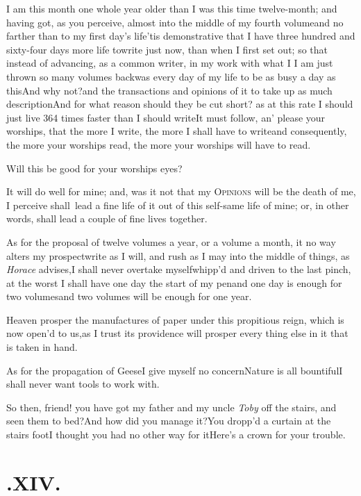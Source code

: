 \documentclass{article}
\begin{document}
I am this month one whole year older than I was this time twelve-month; and having
got, as you perceive, almost into the middle of my fourth volume\tsk and no farther
than to my first day’s life\tsk\break ’tis demonstrative that I have three hundred and
sixty-four days more life to\break write just now, than when I first set out;\break
so that instead of advancing, as a common writer, in my work with
what I
 I am just thrown so many volumes
back\break\tsk was every day of my
life to be as busy a day as this\tsk And why not?\tsk and the transactions and opinions
of it to take up as much description\tsk And for what reason should they be cut short?
as at this rate I should just live 364 times faster than I should write\tsk It must
follow, an’ please your worships, that the more I write, the more I shall have to
write\tsk and consequently, the more your worships read, the more your worships will
have to read.

Will this be good for your worships eyes?

It will do well for mine; and, was it not that my
\textsc{Opinions} will be the death of me, I perceive shall\sic\ 
lead a fine life of it out of this self-same life of mine; or, in
other words, shall lead a couple of fine lives together.

As for the proposal of twelve volumes a year, or a volume a month, it no way alters my
prospect\tsk write as I will, and rush as I may into the middle
of things, as \textit{Horace} advises,\tsk I shall never overtake
myself\tsk whipp’d and driven to the last pinch, at the worst I
shall have one day the start of my pen\tsk and one day is enough
for two volumes\tsk and two volumes will be enough for one
year.\tsk

Heaven prosper the manufactures of paper under this propitious
reign, which is now open’d to us,\tsk as I trust its
pro\-vidence will prosper every thing else in it that is taken in
hand.\tsk\patch{As}

As for the propagation of Geese\tsk I give myself no
concern\tsk Nature is all bountiful\tsk I shall never want
tools to work with.

\tsk So then, friend! you have got my father and my uncle
\textit{Toby} off the stairs, and seen them to bed?\tsk And
how did you manage it?\tsk You dropp’d a curtain at
the stairs foot\tsk I thought you had no other way for
it\tsk Here’s a crown for your trouble.

\smallskip
\section{.\enspace XIV.}
\end{document}
